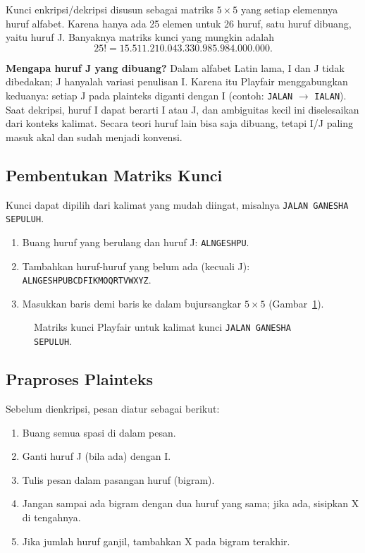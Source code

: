 Kunci enkripsi/dekripsi disusun sebagai matriks $5 \times 5$ yang setiap elemennya huruf alfabet. Karena hanya ada 25 elemen untuk 26 huruf, satu huruf dibuang, yaitu huruf J. Banyaknya matriks kunci yang mungkin adalah
\[
25! = 15.511.210.043.330.985.984.000.000.
\]

\begin{catatan}
\textbf{Mengapa huruf J yang dibuang?} Dalam alfabet Latin lama, I dan J tidak dibedakan; J hanyalah variasi penulisan I. Karena itu Playfair menggabungkan keduanya: setiap J pada plainteks diganti dengan I (contoh: \texttt{JALAN} $\rightarrow$ \texttt{IALAN}). Saat dekripsi, huruf I dapat berarti I atau J, dan ambiguitas kecil ini diselesaikan dari konteks kalimat. Secara teori huruf lain bisa saja dibuang, tetapi I/J paling masuk akal dan sudah menjadi konvensi.
\end{catatan}

\subsection{Pembentukan Matriks Kunci}

Kunci dapat dipilih dari kalimat yang mudah diingat, misalnya \texttt{JALAN GANESHA SEPULUH}.
\begin{enumerate}
  \item Buang huruf yang berulang dan huruf J: \texttt{ALNGESHPU}.
  \item Tambahkan huruf-huruf yang belum ada (kecuali J): \texttt{ALNGESHPUBCDFIKMOQRTVWXYZ}.
  \item Masukkan baris demi baris ke dalam bujursangkar $5 \times 5$ (Gambar~\ref{fig:playfair-kunci}).
\end{enumerate}

\begin{figure}[htbp]
  \centering
  \pfpanel{}{}
  \caption{Matriks kunci Playfair untuk kalimat kunci \texttt{JALAN GANESHA SEPULUH}.}
  \label{fig:playfair-kunci}
\end{figure}

\subsection{Praproses Plainteks}

Sebelum dienkripsi, pesan diatur sebagai berikut:
\begin{enumerate}
  \item Buang semua spasi di dalam pesan.
  \item Ganti huruf J (bila ada) dengan I.
  \item Tulis pesan dalam pasangan huruf (bigram).
  \item Jangan sampai ada bigram dengan dua huruf yang sama; jika ada, sisipkan X di tengahnya.
  \item Jika jumlah huruf ganjil, tambahkan X pada bigram terakhir.
\end{enumerate}

